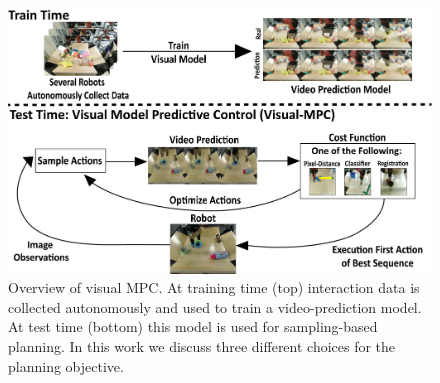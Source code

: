\begin{figure}[t]
\centering
\includegraphics[width=\columnwidth,trim={0mm 0 0 0},clip]{images_general/overview_roughdraft.png}
\caption{\small{Overview of visual MPC. At training time (top) interaction data is collected autonomously and used to train a video-prediction model. At test time (bottom) this model is used for sampling-based planning. In this work we discuss three different choices for the planning objective.}}
\label{fig:overview}
\end{figure}




 





